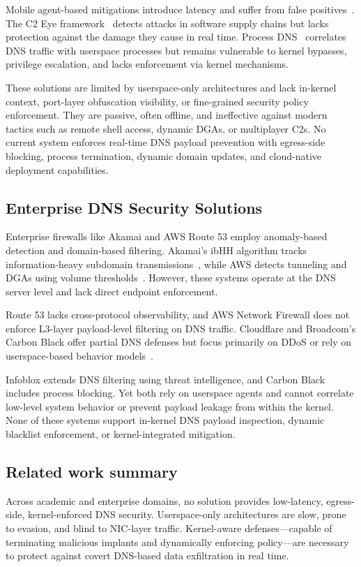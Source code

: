 \documentclass[letterpaper,twocolumn,10pt]{article}
\begin{document}
Mobile agent-based mitigations introduce latency and suffer from false positives~\cite{9486400}. The C2 Eye framework~\cite{haider2024c2} detects attacks in software supply chains but lacks protection against the damage they cause in real time. Process DNS~\cite{sivakorn2019countering} correlates DNS traffic with userspace processes but remains vulnerable to kernel bypasses, privilege escalation, and lacks enforcement via kernel mechanisms.

These solutions are limited by userspace-only architectures and lack in-kernel context, port-layer obfuscation visibility, or fine-grained security policy enforcement. They are passive, often offline, and ineffective against modern tactics such as remote shell access, dynamic DGAs, or multiplayer C2s. No current system enforces real-time DNS payload prevention with egress-side blocking, process termination, dynamic domain updates, and cloud-native deployment capabilities.

\subsection{Enterprise DNS Security Solutions}
Enterprise firewalls like Akamai and AWS Route 53 employ anomaly-based detection and domain-based filtering. Akamai’s ibHH algorithm tracks information-heavy subdomain transmissions~\cite{ozery2023information}, while AWS detects tunneling and DGAs using volume thresholds~\cite{ansari2020reinforcing}. However, these systems operate at the DNS server level and lack direct endpoint enforcement.

Route 53 lacks cross-protocol observability, and AWS Network Firewall does not enforce L3-layer payload-level filtering on DNS traffic. Cloudflare and Broadcom's Carbon Black offer partial DNS defenses but focus primarily on DDoS or rely on userspace-based behavior models~\cite{ahmed2019monitoring}.

Infoblox extends DNS filtering using threat intelligence, and Carbon Black includes process blocking. Yet both rely on userspace agents and cannot correlate low-level system behavior or prevent payload leakage from within the kernel. None of these systems support in-kernel DNS payload inspection, dynamic blacklist enforcement, or kernel-integrated mitigation.


\subsection{Related work summary}
Across academic and enterprise domains, no solution provides low-latency, egress-side, kernel-enforced DNS security. Userspace-only architectures are slow, prone to evasion, and blind to NIC-layer traffic. Kernel-aware defenses—capable of terminating malicious implants and dynamically enforcing policy—are necessary to protect against covert DNS-based data exfiltration in real time.
\end{document}
